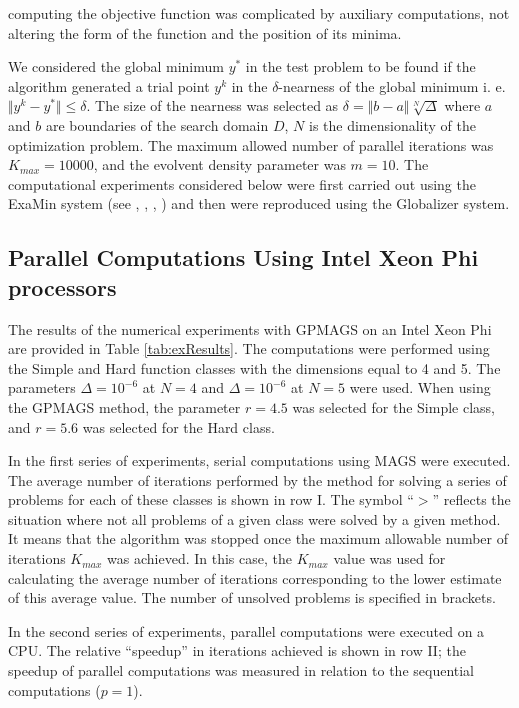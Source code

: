 \documentclass{gOMS2e}
\theoremstyle{plain}%
\theoremstyle{definition}
\theoremstyle{remark}
\begin{document}
computing the objective function was complicated by auxiliary computations, not altering the
form of the function and the position of its minima.
\par
We considered the global minimum \(y^*\) in the test problem to be found if the
algorithm generated a trial point \(y^k\) in the \(\delta\)-nearness of the global
minimum i. e. \(\Vert y^k-y^* \Vert \leqslant \delta\). The size of the nearness was
selected as \(\delta=\Vert b-a \Vert\sqrt[N]{\Delta}\) where \(a\) and \(b\) are
boundaries of the search domain \(D\), \(N\) is the dimensionality of the optimization problem.
The maximum allowed number of parallel iterations was \(K_{max} = 10000\), and the evolvent
density parameter was \(m=10\). The computational experiments considered below were first
carried out using the ExaMin system (see \cite{barkalovGergel2015}, \cite{barkalovGergelLebedev2015},
\cite{barkalovGergelLebedevSysoev2015}, \cite{gergelLebedev2015})
and then were reproduced using the Globalizer system.

\subsection{Parallel Computations Using Intel Xeon Phi processors}
The results of the numerical experiments with GPMAGS on an Intel Xeon Phi are provided in Table \ref{tab:exResults}.
The computations were performed using the Simple and Hard function classes with the
dimensions equal to 4 and 5. The parameters \(\Delta=10^{-6}\) at \(N=4\) and \(\Delta=10^{-6}\) at \(N=5\)
were used. When using the GPMAGS method, the parameter \(r=4.5\) was selected for the
Simple class, and \(r=5.6\) was selected for the Hard class.
\par
In the first series of experiments, serial computations using MAGS were executed.
The average number of iterations performed by the method for solving a series of
problems for each of these classes is shown in row I. The symbol ``\(>\)'' reflects the
situation where not all problems of a given class were solved by a given method.
It means that the algorithm was stopped once the maximum allowable number of
iterations \(K_{max}\) was achieved. In this case, the \(K_{max}\) value was used for
calculating the average number of iterations corresponding to the lower estimate of
this average value. The number of unsolved problems is specified in brackets.
\par
In the second series of experiments, parallel computations were executed on a CPU.
The relative ``speedup'' in iterations achieved is shown in row II; the speedup of
parallel computations was measured in relation to the sequential computations (\(p=1\)).
\end{document}
